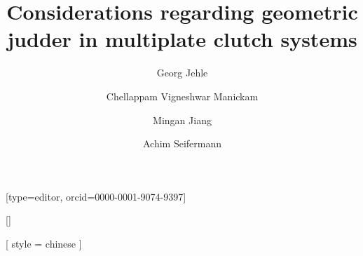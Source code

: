 \documentclass[a4paper,fleqn]{cas-dc}
\begin{document}
\let\WriteBookmarks\relax
\def\floatpagepagefraction{1}
\def\textpagefraction{.001}

\title [mode = title]{Considerations regarding geometric judder in multiplate clutch systems}                      





\author[1,3]{Georg Jehle}[type=editor,
                        orcid=0000-0001-9074-9397]
\cormark[1]
\fnmark[1]


\address[1]{Schaeffler Automotive Buehl GmbH \& Co. KG, Industriestr. 2, Bühl, Germany}

\author[2]{Chellappam Vigneshwar Manickam}[]

\author[3]{Mingan Jiang}[%
   style = chinese
   ]


\address[2]{Rheinwestfälische Technische Hochschule Aachen, Aachen, Germany}

\author[1]{Achim Seifermann}

\address[3]{Schaeffler China., Anting,
    China}

\end{document}
